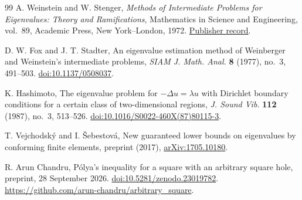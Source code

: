 \documentclass[11pt,reqno]{amsart}
\numberwithin{equation}{section}
\begin{document}
\begin{thebibliography}{99}
A. Weinstein and W. Stenger,
\emph{Methods of Intermediate Problems for Eigenvalues:
Theory and Ramifications},
Mathematics in Science and Engineering, vol.~89,
Academic Press, New York--London, 1972.
\href{https://www.sciencedirect.com/bookseries/mathematics-in-science-and-engineering/vol/89/suppl/C}{Publisher record}.

D. W. Fox and J. T. Stadter,
An eigenvalue estimation method of Weinberger and Weinstein's intermediate problems,
\emph{SIAM J. Math. Anal.} \textbf{8} (1977), no.~3, 491--503.
\href{https://doi.org/10.1137/0508037}{doi:10.1137/0508037}.

K. Hashimoto,
The eigenvalue problem for $-\Delta u=\lambda u$ with Dirichlet boundary
conditions for a certain class of two-dimensional regions,
\emph{J. Sound Vib.} \textbf{112} (1987), no.~3, 513--526.
\href{https://doi.org/10.1016/S0022-460X(87)80115-3}{doi:10.1016/S0022-460X(87)80115-3}.

T. Vejchodsk\'y and I. \v{S}ebestov\'a,
New guaranteed lower bounds on eigenvalues by conforming finite elements,
preprint (2017),
\href{https://arxiv.org/abs/1705.10180}{arXiv:1705.10180}.

R. Arun Chandru,
P\'olya's inequality for a square with an arbitrary square hole,
preprint, 28 September 2026.
\href{https://doi.org/10.5281/zenodo.23019782}{doi:10.5281/zenodo.23019782}.
\url{https://github.com/arun-chandru/arbitrary_square}.

\end{thebibliography}
\end{document}
